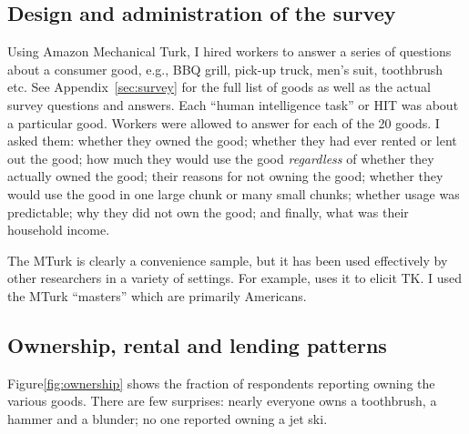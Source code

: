 \documentclass[11pt]{article}
\begin{document}
\subsection{Design and administration of the survey}

Using Amazon Mechanical Turk, I hired workers to answer a series of questions about a consumer good, e.g., BBQ grill, pick-up truck, men's suit, toothbrush etc.
See Appendix~\ref{sec:survey} for the full list of goods as well as the actual survey questions and answers.  
Each ``human intelligence task'' or HIT was about a particular good. 
Workers were allowed to answer for each of the 20 goods.  
I asked them: whether they owned the good; whether they had ever rented or lent out the good; how much they would use the good \emph{regardless} of whether they actually owned the good; their reasons for not owning the good; whether they would use the good in one large chunk or many small chunks; whether usage was predictable; why they did not own the good; and finally, what was their household income. 

The MTurk is clearly a convenience sample, but it has been used effectively by other researchers in a variety of settings. 
For example, \cite{kuziemko2013elastic} uses it to elicit TK. 
I used the MTurk ``masters'' which are primarily Americans. 

\subsection{Ownership, rental and lending patterns} 

Figure\ref{fig:ownership} shows the fraction of respondents reporting owning the various goods.  
There are few surprises: nearly everyone owns a toothbrush, a hammer and a blunder; no one reported owning a jet ski. 
\end{document}
